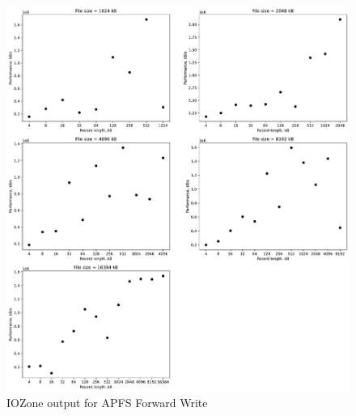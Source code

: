 \begin{figure}[!htb]
	\label{fig:app_benapfsffs_write}
	\begin{center}
		\includegraphics[width=1.0\textwidth]{figures/benchmarking/local/Write.pdf}
	\end{center}
	\caption{IOZone output for \gls{APFS} Forward Write}
\end{figure}

